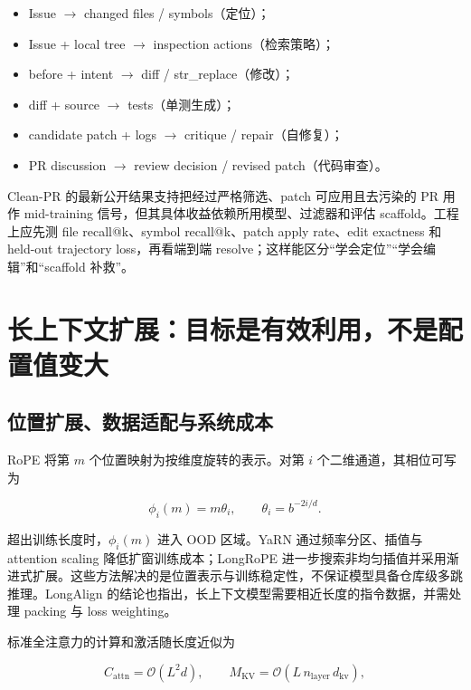 \documentclass[10pt,a4paper,UTF8,fontset=none]{ctexart}
\newcommand{\metric}[1]{\textcolor{GoodGreen}{#1}}
\newcommand{\ident}[1]{{\rmfamily #1}}
\begin{document}
\begin{itemize}
  \item Issue $\rightarrow$ changed files / symbols（定位）；
  \item Issue + local tree $\rightarrow$ inspection actions（检索策略）；
  \item before + intent $\rightarrow$ diff / \ident{str\_replace}（修改）；
  \item diff + source $\rightarrow$ tests（单测生成）；
  \item candidate patch + logs $\rightarrow$ critique / repair（自修复）；
  \item PR discussion $\rightarrow$ review decision / revised patch（代码审查）。
\end{itemize}

Clean-PR 的最新公开结果支持把经过严格筛选、patch 可应用且去污染的 PR 用作 mid-training 信号，但其具体收益依赖所用模型、过滤器和评估 scaffold\cite{zh:lo2026cleanpr}。工程上应先测 \metric{file recall@k}、\metric{symbol recall@k}、patch apply rate、edit exactness 和 held-out trajectory loss，再看端到端 resolve；这样能区分“学会定位”“学会编辑”和“scaffold 补救”。

\section{长上下文扩展：目标是有效利用，不是配置值变大}

\subsection{位置扩展、数据适配与系统成本}

RoPE 将第 $m$ 个位置映射为按维度旋转的表示。对第 $i$ 个二维通道，其相位可写为

\begin{equation}
\phi_i(m)=m\theta_i,\qquad \theta_i=b^{-2i/d}.
\label{zh:eq:rope}
\end{equation}

超出训练长度时，$\phi_i(m)$ 进入 OOD 区域。YaRN 通过频率分区、插值与 attention scaling 降低扩窗训练成本\cite{zh:peng2023yarn}；LongRoPE 进一步搜索非均匀插值并采用渐进式扩展\cite{zh:ding2024longrope}。这些方法解决的是位置表示与训练稳定性，不保证模型具备仓库级多跳推理。LongAlign 的结论也指出，长上下文模型需要相近长度的指令数据，并需处理 packing 与 loss weighting\cite{zh:bai2024longalign}。

标准全注意力的计算和激活随长度近似为

\begin{equation}
C_{\mathrm{attn}}=\mathcal{O}(L^2 d),\qquad M_{\mathrm{KV}}=\mathcal{O}(L\,n_{\mathrm{layer}}\,d_{\mathrm{kv}}),
\label{zh:eq:long-cost}
\end{equation}
\end{document}
